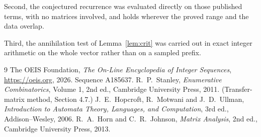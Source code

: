 \documentclass[11pt,a4paper]{article}
\theoremstyle{plain}
\theoremstyle{definition}
\begin{document}
Second, the conjectured recurrence was evaluated directly on those published terms, with no
matrices involved, and holds wherever the proved range and the data overlap.

Third, the annihilation test of Lemma~\ref{lem:crit} was carried out in exact integer
arithmetic on the whole vector rather than on a sampled prefix.

\begin{thebibliography}{9}
 The OEIS Foundation, \emph{The On-Line Encyclopedia of Integer
Sequences}, \url{https://oeis.org}, 2026. Sequence A185637.
 R.~P.~Stanley, \emph{Enumerative Combinatorics}, Volume 1, 2nd ed.,
Cambridge University Press, 2011. (Transfer-matrix method, Section 4.7.)
 J.~E.~Hopcroft, R.~Motwani and J.~D.~Ullman, \emph{Introduction to Automata
Theory, Languages, and Computation}, 3rd ed., Addison--Wesley, 2006.
 R.~A.~Horn and C.~R.~Johnson, \emph{Matrix Analysis}, 2nd ed., Cambridge
University Press, 2013.
\end{thebibliography}
\end{document}
